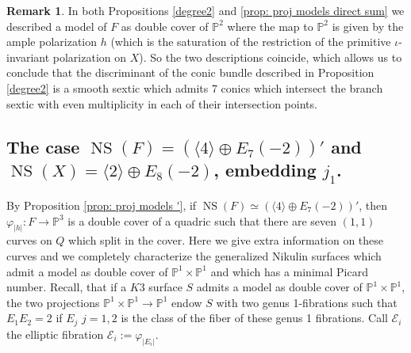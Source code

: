 \documentclass{amsart}
\theoremstyle{definition}
\newtheorem{rem}[thm]{Remark}
\numberwithin{equation}{section}
\numberwithin{equation}{section} \theoremstyle{definition}
\DeclareMathOperator{\NS}{NS}
\newcommand{\ra}{\rightarrow}
\begin{document}
{\begin{rem}{\rm In both  Propositions \ref{degree2}  and \ref{prop: proj models direct sum} we described a model of $F$ as double cover of $\mathbb{P}^2$ where the map to $\mathbb{P}^2$ is given by the ample polarization $h$ (which is the saturation of the restriction of the primitive $\iota$-invariant polarization on $X$). So the two descriptions coincide, which allows us to conclude that the discriminant of the conic bundle described in Proposition \ref{degree2} is a smooth sextic  which admits 7 conics which intersect the branch sextic with even multiplicity in each of their intersection points.}\end{rem}}

\subsection{The case $\NS(F)=(\langle 4\rangle\oplus E_7(-2))'$ and $\NS(X)=\langle 2\rangle\oplus E_8(-2)$, embedding $j_1$.}
By Proposition \ref{prop: proj models '}, if $\NS(F)\simeq (\langle 4\rangle\oplus E_7(-2))'$, then $\varphi_{|h|}:F\ra \mathbb{P}^3$ is a double cover of a quadric such that there are seven $(1,1)$ curves on $Q$ which split in the cover. Here we give extra information on these curves and we completely characterize the generalized Nikulin surfaces which admit a model as double cover of $\mathbb{P}^1\times \mathbb{P}^1$ and which has a minimal Picard number.
Recall, that if a $K3$ surface $S$ admits a model as double cover of $\mathbb{P}^1\times \mathbb{P}^1$, the two projections $\mathbb{P}^1\times \mathbb{P}^1\ra\mathbb{P}^1$ endow $S$ with two genus 1-fibrations such that $E_1E_2=2$ if $E_j$ $j=1,2$ is the class of the fiber of these genus 1 fibrations. Call $\mathcal{E}_i$ the elliptic fibration $\mathcal{E}_i:=\varphi_{|E_i|}$.
\end{document}
